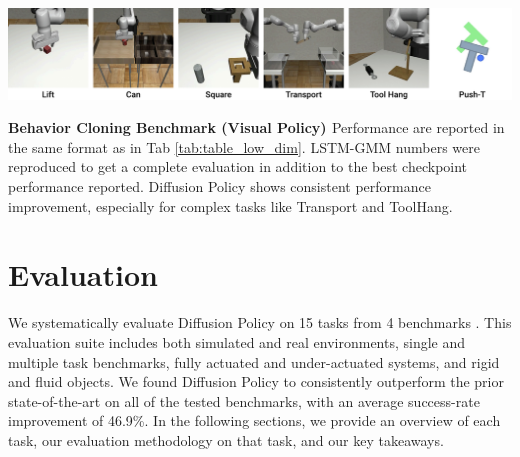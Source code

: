 \begin{table}[h]
    
~~~~~~~~~~~~~~~~~~~~~~~~~~~~~~~~~~~~
\includegraphics[width=0.835\linewidth]{figure/sim_task_thumbnails.pdf}
\label{tab:sim_benchmark_state}

\vspace{1mm}
{
\centering


\caption{\textbf{Behavior Cloning Benchmark (State Policy) \label{tab:table_low_dim} } 
We present success rates with different checkpoint selection methods in the format of (max performance) / (average of last 10 checkpoints), with each averaged across 3 training seeds and 50 different environment initial conditions (150 in total). 
LSTM-GMM corresponds to BC-RNN in RoboMimic\cite{robomimic}, which we reproduced and obtained slightly {better} results than the original paper. Our results show that Diffusion Policy significantly improves state-of-the-art performance across the board.
}
\vspace{2mm}



\caption{\textbf{Behavior Cloning Benchmark (Visual Policy) \label{tab:table_image}} Performance are reported in the same format as in Tab \ref{tab:table_low_dim}. LSTM-GMM numbers were reproduced to get a complete evaluation in addition to the best checkpoint performance reported. Diffusion Policy shows consistent performance improvement, especially for complex tasks like Transport and ToolHang. }
}
\end{table}

\section{Evaluation}
We systematically evaluate Diffusion Policy on 15 tasks from 4 benchmarks \cite{ibc, gupta2019relay, robomimic, bet}. This evaluation suite includes both simulated and real environments, single and multiple task benchmarks, fully actuated and under-actuated systems, and rigid and fluid objects.  We found Diffusion Policy to consistently outperform the prior state-of-the-art on all of the tested benchmarks, with an average success-rate improvement of 46.9\%. In the following sections, we  provide an overview of each task, our evaluation methodology on that task, and our key takeaways.

